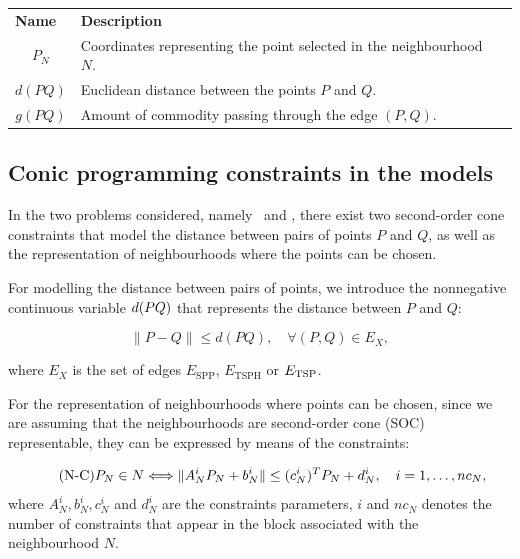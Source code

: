 \documentclass[a4paper,  review, authoryear, 1p., doubleblind]{elsarticle}
\newcommand{\SPPN}{{\sf{H-SPPN}\xspace }}
\newcommand{\TSPN}{{\sf{H-TSPN}\xspace }}
\newcommand{\ESPP}{{E_{\text{SPP}}}}
\newcommand{\ETSPH}{{E_{\text{TSPH}}}}
\begin{document}
\begin{table}[h!]
\begin{tabular}{|cl|l}
			\multicolumn{1}{|l|}{\textbf{Name}} & \textbf{Description} &  \\ \cline{1-2}
			\multicolumn{1}{|c|}{$P_N$} & Coordinates representing the point selected in the neighbourhood $N$. &  \\ \cline{1-2}
			\multicolumn{1}{|c|}{$d(PQ)$} & Euclidean distance between the points $P$ and $Q$. &  \\ \cline{1-2}
			\multicolumn{1}{|c|}{$g(PQ)$} & Amount of commodity passing through the edge $(P, Q)$. &  \\ \cline{1-2}
		\end{tabular}
	\end{table}
	
	\subsection{Conic programming constraints in the models}
	In the two problems considered, namely \SPPN \ and \TSPN, there exist two second-order cone constraints that model the distance between pairs of points $P$ and $Q$, as well as the representation of neighbourhoods where the points can be chosen.
	
	\newcommand{\dvar}[2]{d(#1#2)}
	
	For modelling the distance between pairs of points, we introduce the nonnegative continuous variable $\dvar{PQ}$ that represents the distance between $P$ and $Q$:
	
	
	\begin{equation*}\tag{d-C}\label{eq:dC}
		\|P - Q\|\leq \dvar{P}{Q},\quad\forall (P,Q)\in E_X,
	\end{equation*}
	
	where $E_X$ is the set of edges $\ESPP$, $\ETSPH$ or $E_{\rm{TSP}}$.
	
	For the representation of neighbourhoods where points can be chosen, since we are assuming that the neighbourhoods are second-order cone (SOC) representable, they can be expressed by means of the constraints:
	
	\begin{equation*}\tag{N-C}\label{eq:nC}
		P_N\in N \Longleftrightarrow
		\|A_N^i P_N + b_N^i\| \leq (c_N^i)^T P_N + d_N^i,\quad i=1,\ldots,nc_N, \\
	\end{equation*}
	where $A_N^i, b_N^i, c_N^i$ and $d_N^i$ are the constraints parameters, $i$ and $nc_N$ denotes the number of constraints that appear in the block associated with the neighbourhood $N$.
	
\end{document}

